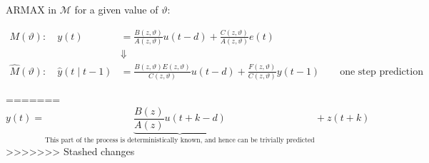 ARMAX in $\mathcal{M}$ for a given value of $\vartheta$:

\begin{align*}
	M(\vartheta):\quad y(t)&=\frac{B(z, \vartheta)}{A(z, \vartheta)} u(t-d)+\frac{C(z, \vartheta)}{A(z, \vartheta)} e(t)\\
	&\Downarrow\\
	\hat{M}(\vartheta): \quad \hat{y}(t \mid t-1) &=\frac{B(z,\vartheta) E(z,\vartheta)}{C(z,\vartheta)} u(t-d)+\frac{F(z,\vartheta)}{C(z,\vartheta)} y(t-1) \qquad \text{one step prediction}
\end{align*}



=======
$$y(t)=\underbrace{\frac{B(z)}{A(z)} u(t+k-d)}_{\text{This part of the process 
		is deterministically 
		known, and hence can 
		be trivially predicted}} +z(t+k)$$
>>>>>>> Stashed changes

